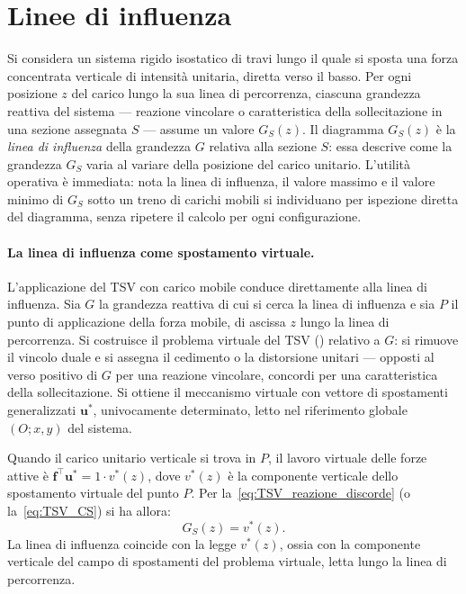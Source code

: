 \section{Linee di influenza}
\label{sec:linee_influenza}

Si considera un sistema rigido isostatico di travi lungo
il quale si sposta una forza concentrata verticale di
intensità unitaria, diretta verso il basso. Per ogni
posizione $z$ del carico lungo la sua linea di
percorrenza, ciascuna grandezza reattiva del sistema ---
reazione vincolare o caratteristica della sollecitazione
in una sezione assegnata $S$ --- assume un valore
$G_S(z)$. Il diagramma $G_S(z)$ è la \emph{linea di
	influenza} della grandezza $G$ relativa alla sezione $S$:
essa descrive come la grandezza $G_S$ varia al variare
della posizione del carico unitario. L'utilità operativa
è immediata: nota la linea di influenza, il valore massimo
e il valore minimo di $G_S$ sotto un treno di carichi
mobili si individuano per ispezione diretta del diagramma,
senza ripetere il calcolo per ogni configurazione.


\paragraph{La linea di influenza come spostamento virtuale.}
L'applicazione del TSV con carico mobile conduce
direttamente alla linea di influenza. Sia $G$ la grandezza
reattiva di cui si cerca la linea di influenza e sia $P$ il
punto di applicazione della forza mobile, di ascissa $z$
lungo la linea di percorrenza. Si costruisce il problema
virtuale del TSV () relativo a $G$: si
rimuove il vincolo duale e si assegna il cedimento o la
distorsione unitari --- opposti al verso positivo di $G$
per una reazione vincolare, concordi per una caratteristica
della sollecitazione. Si ottiene il meccanismo virtuale con
vettore di spostamenti generalizzati $\bm{u}^*$, univocamente
determinato, letto nel riferimento globale $(O; x, y)$ del
sistema.

Quando il carico unitario verticale si trova in $P$, il
lavoro virtuale delle forze attive è $\bm{f}^\top\bm{u}^*
= 1 \cdot v^*(z)$, dove $v^*(z)$ è la componente verticale
dello spostamento virtuale del punto $P$. Per
la~\eqref{eq:TSV_reazione_discorde} (o la~\eqref{eq:TSV_CS})
si ha allora:
\begin{equation}\label{eq:LI_formula}
	\boxed{\,G_S(z) = v^*(z).\,}
\end{equation}
La linea di influenza coincide con la legge $v^*(z)$,
ossia con la componente verticale del campo di spostamenti
del problema virtuale, letta lungo la linea di percorrenza.


